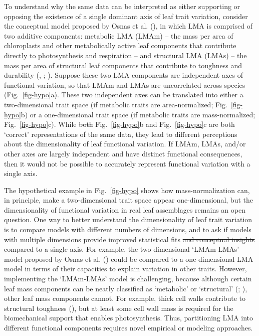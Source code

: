 \documentclass[
  12pt,
  letterpaper,
  DIV=11,
  numbers=noendperiod]{scrartcl}
\providecommand{\DIFadd}[1]{{\protect\color{blue}\uwave{#1}}} %
\providecommand{\DIFdel}[1]{{\protect\color{red}\sout{#1}}}                      %
\providecommand{\DIFaddbegin}{} %
\providecommand{\DIFaddend}{} %
\providecommand{\DIFdelbegin}{} %
\providecommand{\DIFdelend}{} %
\newcommand{\DIFscaledelfig}{0.5}
\newlength{\DIFdelgraphicswidth} %
\newlength{\DIFdelgraphicsheight} %
\newcommand{\DIFaddincludegraphics}[2][]{{\color{blue}\fbox{\DIFOincludegraphics[#1]{#2}}}} %
\newcommand{\DIFdelincludegraphics}[2][]{%
\sbox{\DIFdelgraphicsbox}{\DIFOincludegraphics[#1]{#2}}%
\settoboxwidth{\DIFdelgraphicswidth}{\DIFdelgraphicsbox} %
\settoboxtotalheight{\DIFdelgraphicsheight}{\DIFdelgraphicsbox} %
\scalebox{\DIFscaledelfig}{%
\parbox[b]{\DIFdelgraphicswidth}{\usebox{\DIFdelgraphicsbox}\\[-\baselineskip] \rule{\DIFdelgraphicswidth}{0em}}\llap{\resizebox{\DIFdelgraphicswidth}{\DIFdelgraphicsheight}{%
\setlength{\unitlength}{\DIFdelgraphicswidth}%
\begin{picture}(1,1)%
\thicklines\linethickness{2pt} %
{\color[rgb]{1,0,0}\put(0,0){\framebox(1,1){}}}%
{\color[rgb]{1,0,0}\put(0,0){\line( 1,1){1}}}%
{\color[rgb]{1,0,0}\put(0,1){\line(1,-1){1}}}%
\end{picture}%
}\hspace*{3pt}}} %
} %
\DeclareRobustCommand{\DIFaddbegin}{\DIFOaddbegin \let\includegraphics\DIFaddincludegraphics} %
\DeclareRobustCommand{\DIFaddend}{\DIFOaddend \let\includegraphics\DIFOincludegraphics} %
\DeclareRobustCommand{\DIFdelbegin}{\DIFOdelbegin \let\includegraphics\DIFdelincludegraphics} %
\DeclareRobustCommand{\DIFdelend}{\DIFOaddend \let\includegraphics\DIFOincludegraphics} %
\begin{document}
To understand why the same data can be interpreted as either supporting
or opposing the existence of a single dominant axis of leaf trait
variation, consider the conceptual model proposed by Osnas et al.
(), in which LMA is comprised of two
additive components: metabolic LMA (LMAm) -- the mass per area of
chloroplasts and other metabolically active leaf components that
contribute directly to photosynthesis and respiration -- and structural
LMA (LMAs) -- the mass per area of structural leaf components that
contribute to toughness and durability
(,
; ). Suppose these two LMA components are independent axes of
functional variation, so that LMAm and LMAs are uncorrelated across
species (Fig.~\ref{fig-hypo}a). These two independent axes can be
translated into either a two-dimensional trait space (if metabolic
traits are area-normalized; Fig.~\ref{fig-hypo}b) or a \DIFaddbegin \DIFadd{primarily
}\DIFaddend one-dimensional trait space (if metabolic traits are mass-normalized;
Fig.~\ref{fig-hypo}c). While \DIFdelbegin \DIFdel{both }\DIFdelend Fig.~\ref{fig-hypo}b and
Fig.~\ref{fig-hypo}c are both `correct' representations of the same
data, they lead to different perceptions about the dimensionality of
leaf functional variation. If LMAm, LMAs, and/or other axes are largely
independent and have distinct functional consequences, then it would not
be possible to accurately represent functional variation with a single
axis.

The hypothetical example in Fig.~\ref{fig-hypo} shows how
mass-normalization can, in principle, make a two-dimensional trait space
appear one-dimensional, but the dimensionality of functional variation
in real leaf assemblages remains an open question. One way to better
understand the dimensionality of leaf trait variation is to compare
models with different numbers of dimensions, and to ask if models with
multiple dimensions provide improved statistical fits \DIFdelbegin \DIFdel{and conceptual
insights }\DIFdelend compared to a
single axis. For example, the two-dimensional `LMAm-LMAs' model proposed
by Osnas et al. () could be compared to a
one-dimensional LMA model in terms of their capacities to explain
variation in other traits. However, implementing the `LMAm-LMAs' model
is challenging, because although certain leaf mass components can be
neatly classified as `metabolic' or `structural'
(;
), other leaf mass
components cannot. For example, thick cell walls contribute to
structural toughness (), but
at least some cell wall mass is required for the biomechanical support
that enables photosynthesis. Thus, partitioning LMA into different
functional components requires novel empirical or modeling approaches.
\end{document}
